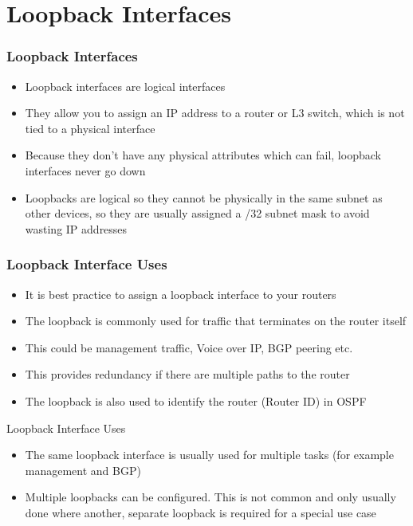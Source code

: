 \documentclass[pdflatex,compress,mathserif]{beamer}
\begin{document}
\section{Loopback Interfaces}

\begin{frame}
	\frametitle{Loopback Interfaces}
	\begin{itemize}
		\item Loopback interfaces are logical interfaces
		\item They allow you to assign an IP address to a router or L3 switch, which is
not tied to a physical interface
		\item Because they don’t have any physical attributes which can fail, loopback
interfaces never go down
		\item Loopbacks are logical so they cannot be physically in the same subnet as
other devices, so they are usually assigned a /32 subnet mask to avoid
wasting IP addresses
	\end{itemize}
\end{frame}

\begin{frame}
	\frametitle{Loopback Interface Uses}
	\begin{itemize}
		\item It is best practice to assign a loopback interface to your routers
		\item The loopback is commonly used for traffic that terminates on the router
itself
		\item This could be management traffic, Voice over IP, BGP peering etc.
		\item This provides redundancy if there are multiple paths to the router
		\item The loopback is also used to identify the router (Router ID) in OSPF
	\end{itemize}
\end{frame}

\begin{frame}{Loopback Interface Uses}
	\begin{itemize}
		\item The same loopback interface is usually used for multiple tasks (for
example management and BGP)
		\item Multiple loopbacks can be configured. This is not common and only
usually done where another, separate loopback is required for a special
use case
	\end{itemize}
\end{frame}
\end{document}
